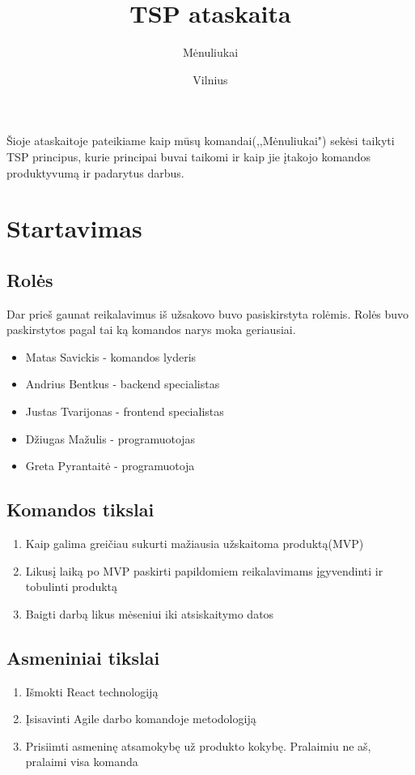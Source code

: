 \documentclass{VUMIFInfKursinis}
\title{TSP ataskaita}
\author{Mėnuliukai}
\date{Vilnius \\ \the\year}
\begin{document}
\maketitle

\tableofcontents

\begin{samepage}

Šioje ataskaitoje pateikiame kaip mūsų komandai(,,Mėnuliukai") sekėsi taikyti TSP principus, kurie principai buvai taikomi ir kaip jie įtakojo komandos produktyvumą ir padarytus darbus.

\section{Startavimas}
	\subsection{Rolės}
		Dar prieš gaunat reikalavimus iš užsakovo buvo pasiskirstyta rolėmis. Rolės buvo paskirstytos pagal tai ką komandos narys moka geriausiai.
		\begin{itemize}
			\item{Matas Savickis - komandos lyderis}
			\item{Andrius Bentkus - backend specialistas}
			\item{Justas Tvarijonas - frontend specialistas}
			\item{Džiugas Mažulis - programuotojas}
			\item{Greta Pyrantaitė - programuotoja}
		\end{itemize}
	\subsection{Komandos tikslai}
		\begin{enumerate}
			\item{Kaip galima greičiau sukurti mažiausia užskaitoma produktą(MVP)}
			\item{Likusį laiką po MVP paskirti papildomiem reikalavimams įgyvendinti ir tobulinti produktą}
			\item{Baigti darbą likus mėseniui iki atsiskaitymo datos}
		\end{enumerate}
	\subsection{Asmeniniai tikslai}
		\begin{enumerate}
			\item{Išmokti React technologiją}
			\item{Įsisavinti Agile darbo komandoje metodologiją}
			\item{Prisiimti asmeninę atsamokybę už produkto kokybę. Pralaimiu ne aš, pralaimi visa komanda}
		\end{enumerate}
\end{samepage}
\end{document}
